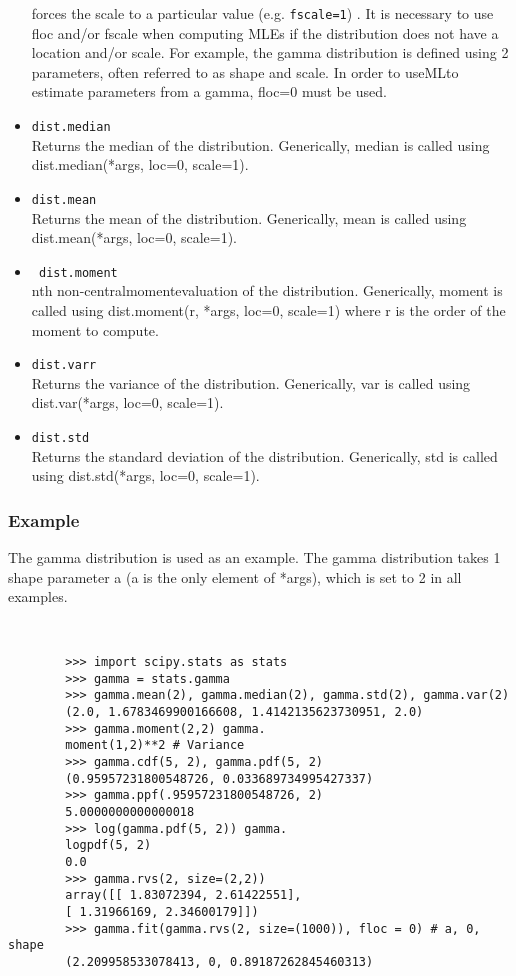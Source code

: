 \documentclass[KSmain.tex]{subfiles}
\begin{document}
\begin{itemize}
	forces the scale to a particular value (e.g. \texttt{fscale=1}) . It is necessary to use floc and/or fscale when
	computing MLEs if the distribution does not have a location and/or scale. For example, the gamma distribution
	is defined using 2 parameters, often referred to as shape and scale. In order to useMLto estimate
	parameters from a gamma, floc=0 must be used.
	\item \texttt{dist.median}\\
	Returns the median of the distribution. Generically, median is called using dist.median(*args, loc=0, scale=1).
	\item \texttt{dist.mean}\\
	Returns the mean of the distribution. Generically, mean is called using dist.mean(*args, loc=0, scale=1).
	\item\texttt{ dist.moment}\\
	nth non-centralmomentevaluation of the distribution. Generically, moment is called using dist.moment(r, *args,
	loc=0, scale=1) where r is the order of the moment to compute.
	\item \texttt{dist.varr}\\
	Returns the variance of the distribution. Generically, var is called using dist.var(*args, loc=0, scale=1).
	\item \texttt{dist.std}\\
	Returns the standard deviation of the distribution. Generically, std is called using dist.std(*args, loc=0, scale=1).
\end{itemize}
\subsubsection{Example}
The gamma distribution is used as an example. The gamma distribution takes 1 shape parameter a (a is
the only element of *args), which is set to 2 in all examples.
\begin{framed}
	\begin{verbatim}
		
		
		>>> import scipy.stats as stats
		>>> gamma = stats.gamma
		>>> gamma.mean(2), gamma.median(2), gamma.std(2), gamma.var(2)
		(2.0, 1.6783469900166608, 1.4142135623730951, 2.0)
		>>> gamma.moment(2,2) gamma.
		moment(1,2)**2 # Variance
		>>> gamma.cdf(5, 2), gamma.pdf(5, 2)
		(0.95957231800548726, 0.033689734995427337)
		>>> gamma.ppf(.95957231800548726, 2)
		5.0000000000000018
		>>> log(gamma.pdf(5, 2)) gamma.
		logpdf(5, 2)
		0.0
		>>> gamma.rvs(2, size=(2,2))
		array([[ 1.83072394, 2.61422551],
		[ 1.31966169, 2.34600179]])
		>>> gamma.fit(gamma.rvs(2, size=(1000)), floc = 0) # a, 0, shape
		(2.209958533078413, 0, 0.89187262845460313)
	\end{verbatim}
\end{framed}
\end{document}
